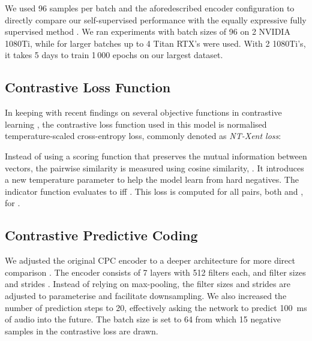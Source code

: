 \documentclass{article}
\begin{document}
We used 96 samples per batch and the aforedescribed encoder configuration to directly compare our self-supervised performance with the equally expressive fully supervised method \cite{lee2018samplecnn}.
We ran experiments with batch sizes of 96 on 2 NVIDIA 1080Ti, while for larger batches up to 4  Titan RTX's were used. With 2 1080Ti's, it takes 5 days to train 1\,000 epochs on our largest dataset.



\subsection{Contrastive Loss Function}
In keeping with recent findings on several objective functions in contrastive learning \cite{chen_simple_2020}, the contrastive loss function used in this model is normalised temperature-scaled cross-entropy loss, commonly denoted as \emph{NT-Xent loss}:



Instead of using a scoring function that preserves the mutual information between vectors, the pairwise similarity is measured using cosine similarity, .
It introduces a new temperature parameter  to help the model learn from hard negatives.
The indicator function  evaluates to  iff .
This loss is computed for all pairs, both  and , for . 




\subsection{Contrastive Predictive Coding}
We adjusted the original CPC encoder  \cite{oord_representation_2019} to a deeper architecture for more direct comparison \cite{lee2018samplecnn}. The encoder  consists of 7 layers with 512 filters each, and filter sizes  and strides .
Instead of relying on max-pooling, the filter sizes and strides are adjusted to parameterise and facilitate downsampling.
We also increased the number of prediction steps  to 20, effectively asking the network to predict 100~ms of audio into the future. The batch size is set to 64 from which 15 negative samples in the contrastive loss are drawn.
\end{document}
